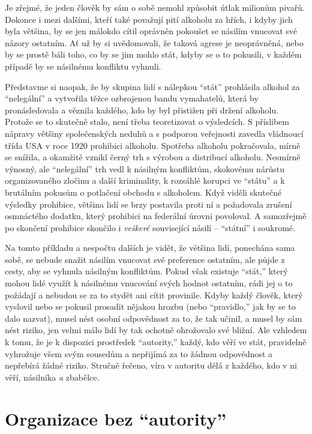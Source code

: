 \documentclass{book}
\begin{document}
Je zřejmé, že jeden člověk by sám o sobě nemohl způsobit útlak milionům pivařů. Dokonce i mezi dalšími, kteří také považují pití alkoholu za hřích, i kdyby jich byla většina, by se jen málokdo cítil oprávněn pokoušet se násilím vnucovat své názory ostatním. Ať už by si uvědomovali, že taková agrese je neoprávněná, nebo by se prostě báli toho, co by se jim mohlo stát, kdyby se o to pokusili, v každém případě by se násilnému konfliktu vyhnuli.

Představme si naopak, že by skupina lidí s nálepkou \enquote{stát} prohlásila alkohol za \enquote{nelegální} a vytvořila těžce ozbrojenou bandu vymahatelů, která by pronásledovala a věznila každého, kdo by byl přistižen při držení alkoholu. Protože se to skutečně stalo, není třeba teoretizovat o výsledcích. S příslibem nápravy většiny společenských neduhů a s podporou veřejnosti zavedla vládnoucí třída USA v roce 1920 prohibici alkoholu. Spotřeba alkoholu pokračovala, mírně se snížila, a okamžitě vznikl černý trh s výrobou a distribucí alkoholu. Nesmírně výnosný, ale \enquote{nelegální} trh vedl k násilným konfliktům, skokovému nárůstu organizovaného zločinu a další kriminality, k rozsáhlé korupci ve \enquote{státu} a k brutálním pokusům o potlačení obchodu s alkoholem. Když viděli skutečné výsledky prohibice, většina lidí se brzy postavila proti ní a požadovala zrušení osmnáctého dodatku, který prohibici na federální úrovni povoloval. A samozřejmě po skončení prohibice skončilo i \emph{veškeré} související násilí -- \enquote{státní} i soukromé.

Na tomto příkladu a nespočtu dalších je vidět, že většina lidí, ponechána sama sobě, se nebude snažit násilím vnucovat své preference ostatním, ale půjde z cesty, aby se vyhnula násilným konfliktům. Pokud však existuje \enquote{stát,} který mohou lidé využít k násilnému vnucování svých hodnot ostatním, rádi jej o to požádají a nebudou se za to stydět ani cítit provinile. Kdyby každý člověk, který vyslovil nebo se pokusil prosadit nějakou hrozbu (nebo \enquote{pravidlo,} jak by se to dalo nazvat), musel nést osobní odpovědnost za to, že tak učinil, a musel by sám nést riziko, jen velmi málo lidí by tak ochotně ohrožovalo své bližní. Ale vzhledem k tomu, že je k dispozici prostředek \enquote{autority,} každý, kdo věří ve stát, pravidelně vyhrožuje všem svým sousedům a nepřijímá za to žádnou odpovědnost a nepřebírá žádné riziko. Stručně řečeno, víra v autoritu dělá z každého, kdo v ni věří, násilníka \emph{a} zbabělce.

\section{Organizace bez \enquote{autority}}
\end{document}
